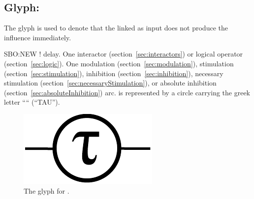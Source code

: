 \color{red}
\subsection{Glyph: }\label{sec:delay}

The glyph  is used to denote that the  linked as input does not produce the influence immediately.

\begin{glyphDescription}
 \glyphSboTerm SBO:NEW ! delay.
 \glyphOrigin One interactor (section~\ref{sec:interactors}) or logical operator (section~\ref{sec:logic}).
 \glyphTarget  One modulation (section~\ref{sec:modulation}), stimulation (section~\ref{sec:stimulation}), inhibition (section~\ref{sec:inhibition}), necessary  stimulation (section~\ref{sec:necessaryStimulation}), or absolute inhibition (section~\ref{sec:absoluteInhibition}) arc.
 \glyphNode {} is represented by a circle carrying the greek letter ``\tau`` (``TAU'').
 \end{glyphDescription}

\begin{figure}[H]
  \centering
  \includegraphics[scale = 0.5]{images/delay}
  \caption{The \ER glyph for .}
  \label{fig:not}
\end{figure}

